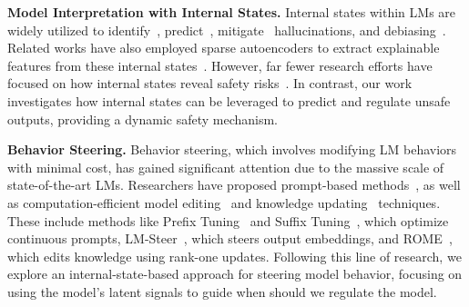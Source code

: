 \textbf{Model Interpretation with Internal States.} Internal states within LMs are widely utilized to identify~\cite{azaria2023internal,chen2024inside,zablocki2024assessing}, predict~\cite{wang2024hidden,ji2024llm}, mitigate~\cite{alnuhait2024factcheckmate,belrose2023eliciting,Overshadowing2024} hallucinations, and debiasing~\cite{debiasinggradient2023}. Related works have also employed sparse autoencoders to extract explainable features from these internal states~\cite{cunningham2023sparse,geva2022transformer}. However, far fewer research efforts have focused on how internal states reveal safety risks~\cite{zou2023representation,li2024rethinking,choi2024safety}. In contrast, our work investigates how internal states can be leveraged to predict and regulate unsafe outputs, providing a dynamic safety mechanism.


\textbf{Behavior Steering.} Behavior steering, which involves modifying LM behaviors with minimal cost, has gained significant attention due to the massive scale of state-of-the-art LMs. Researchers have proposed prompt-based methods~\cite{sahoo2024systematic,wei2022chain}, as well as computation-efficient model editing~\cite{yao2023editing,wang2024knowledge} and knowledge updating~\cite{ripple2024,eventedit2024} techniques. These include methods like Prefix Tuning~\cite{li2021prefix} and Suffix Tuning~\cite{zou2023universal}, which optimize continuous prompts, LM-Steer~\cite{han2024word}, which steers output embeddings, and ROME~\cite{meng2022locating}, which edits knowledge using rank-one updates. Following this line of research, we explore an internal-state-based approach for steering model behavior, focusing on using the model's latent signals to guide when should we regulate the model.


